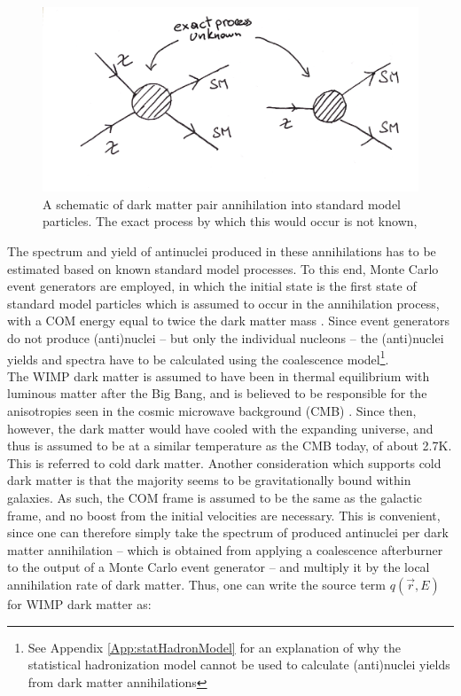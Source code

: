 \begin{figure}[hbtq]
    \centering
    \includegraphics[width=\textwidth]{figures/DM_processes.pdf}
    \caption{A schematic of dark matter pair annihilation into standard model particles. The exact process by which this would occur is not known,  }
    \label{fig:DM_ann_decay_processes}
\end{figure}

The spectrum and yield of antinuclei produced in these annihilations has to be estimated based on known standard model processes. To this end, Monte Carlo event generators are employed\cite{}, in which the initial state is the first state of standard model particles which is assumed to occur in the annihilation process, with a COM energy equal to twice the dark matter mass \dmm\cite{particle physics cookbook, also https://arxiv.org/pdf/hep-ph/9904481.pdf}. Since event generators do not produce (anti)nuclei -- but only the individual nucleons -- the (anti)nuclei yields and spectra have to be calculated using the coalescence model\footnote{See Appendix \ref{App:statHadronModel} for an explanation of why the statistical hadronization model cannot be used to calculate (anti)nuclei yields from dark matter annihilations}.  \\ 

The WIMP dark matter is assumed to have been in thermal equilibrium with luminous matter after the Big Bang, and is believed to be responsible for the anisotropies seen in the cosmic microwave background (CMB) \cite{}. Since then, however, the dark matter would have cooled with the expanding universe, and thus is assumed to be at a similar temperature as the CMB today, of about 2.7K\cite{}. This is referred to cold dark matter. Another consideration which supports cold dark matter is that the majority seems to be gravitationally bound within galaxies\cite{}. As such, the COM frame is assumed to be the same as the galactic frame, and no boost from the initial velocities are necessary. This is convenient, since one can therefore simply take the spectrum of produced antinuclei per dark matter annihilation -- which is obtained from applying a coalescence afterburner to the output of a Monte Carlo event generator -- and multiply it by the local annihilation rate of dark matter. Thus, one can write the source term $q(\vec{r}, E)$ for WIMP dark matter as: 

